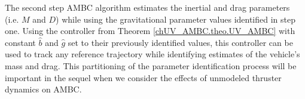 The second step \ac{AMBC} algorithm estimates the inertial and drag
parameters (i.e. $M$ and $D$) while using the gravitational parameter
values identified in step one.  Using the controller from Theorem
\ref{chUV_AMBC.theo.UV_AMBC} with constant $\hat{b}$ and $\hat{g}$ set
to their previously identified values, this controller can be used to
track any reference trajectory while identifying estimates of the
vehicle's mass and drag.  This partitioning of the parameter
identification process will be important in the sequel when we
consider the effects of unmodeled thruster dynamics on \ac{AMBC}.

